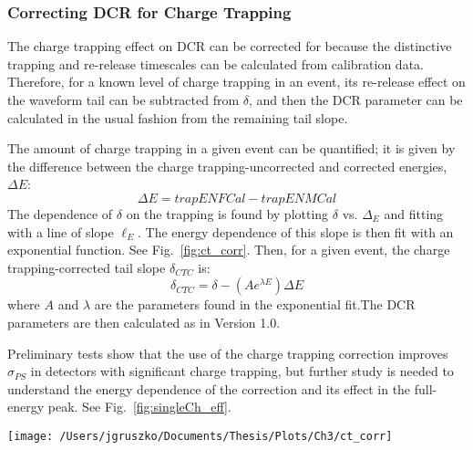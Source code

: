\subsubsection{Correcting DCR for Charge Trapping}
The charge trapping effect on DCR can be corrected for because the distinctive trapping and re-release timescales can be calculated from calibration data. Therefore, for a known level of charge trapping in an event, its re-release effect on the waveform tail can be subtracted from $\delta$, and then the DCR parameter can be calculated in the usual fashion from the remaining tail slope. 

The amount of charge trapping in a given event can be quantified; it is given by the difference between the charge trapping-uncorrected and corrected energies, $\Delta E$:
$$\Delta E =  trapENFCal-trapENMCal $$
The dependence of $\delta$ on the trapping is found by plotting $\delta$ vs. $\Delta_{E}$ and fitting with a line of slope $\ell_{E}$. The energy dependence of this slope is then fit with an exponential function. See Fig.~\ref{fig:ct_corr}. Then, for a given event, the charge trapping-corrected tail slope $\delta_{CTC}$ is:
$$\delta_{CTC} = \delta - (Ae^{\lambda E})\Delta E$$
where $A$ and $\lambda$ are the parameters found in the exponential fit.The DCR parameters are then calculated as in Version 1.0.

Preliminary tests show that the use of the charge trapping correction improves $\sigma_{PS}$ in detectors with significant charge trapping, but further study is needed to understand the energy dependence of the correction and its effect in the full-energy peak. See Fig.~\ref{fig:singleCh_eff}.

\begin{figure*}[t]
 \centering
 \texttt{[image: /Users/jgruszko/Documents/Thesis/Plots/Ch3/ct\_corr]}
 \caption[The steps of the charge trapping tail slope correction]{The steps of the charge trapping tail slope correction, in P42537A, a high charge trapping detector in DS3. {\it Left:} $\delta$ vs. $\Delta$E is plotted and fit with a line of slope $\ell_E$ for each energy peak. The fit is shown for the 2615 keV peak. {\it Center:} $\ell_E$ is plotted with respect to E and fit with an exponential, in red. {\it Right:} When corrected using the resulting parameters, the charge-trapping-corrected DCR distribution in the 2614 keV peak, in blue, is narrower and with a smaller high-DCR tail than the uncorrected distribution, in red.} 
 \label{fig:ct_corr}
\end{figure*}


